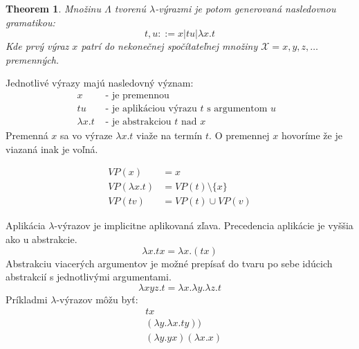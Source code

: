 \documentclass[a4paper,10pt,oneside]{report}%
\newtheorem{theorem}{Theorem}
\begin{document}
\begin{theorem}
    Množinu $\Lambda$ tvorenú $\lambda$-výrazmi je potom generovaná nasledovnou gramatikou:
    \begin{equation}
        t, u ::= x | t u | \lambda x.t
    \end{equation}
    Kde prvý výraz $x$ patrí do nekonečnej spočítateľnej množiny $\mathcal{X}={x,y,z,\dots}$
premenných.
\end{theorem}
    Jednotlivé výrazy majú nasledovný význam:
\begin{align*}
     x          & \textrm{ - je premennou }\\
     t u        & \textrm{ - je aplikáciou výrazu $t$ s argumentom $u$ }\\
    \lambda x.t & \textrm{ - je abstrakciou $t$ nad $x$ }
\end{align*}
    Premenná $x$ sa vo výraze $\lambda x . t$ viaže na termín $t$. O premennej
$x$ hovoríme že je viazaná inak je voľná.

\begin{center}
    \begin{align*}
        VP(x) &= {x} \\
        VP(\lambda x.t) &= VP(t)  \setminus \{x\} \\
        VP(t v) &= VP(t) \cup VP(v)
    \end{align*}
\end{center}
    Aplikácia $\lambda$-výrazov je implicitne aplikovaná zľava.
    Precedencia aplikácie je vyššia ako u abstrakcie.
\begin{equation*}
    \lambda x . t x = \lambda x . (t x)
\end{equation*}
    Abstrakciu viacerých argumentov je možné prepísať do tvaru po sebe idúcich
abstrakcií s jednotlivými argumentami.
\begin{equation*}
    \lambda x y z . t = \lambda x . \lambda y . \lambda z . t
\end{equation*}
    Príkladmi $\lambda$-výrazov môžu byť:
\begin{align*}
    & t x                             \\
    & (\lambda y . \lambda x . t y )) \\
    & (\lambda y.y x) (\lambda x . x) \\
\end{align*}
\end{document}
